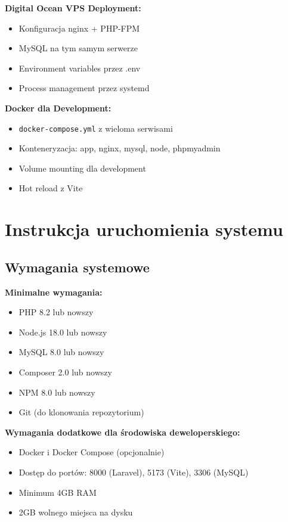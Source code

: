\documentclass[12pt,a4paper]{article}
\begin{document}
    \textbf{Digital Ocean VPS Deployment:}
    \begin{itemize}
        \item Konfiguracja nginx + PHP-FPM
        \item MySQL na tym samym serwerze
        \item Environment variables przez .env
        \item Process management przez systemd
    \end{itemize}

    \textbf{Docker dla Development:}
    \begin{itemize}
        \item \texttt{docker-compose.yml} z wieloma serwisami
        \item Konteneryzacja: app, nginx, mysql, node, phpmyadmin
        \item Volume mounting dla development
        \item Hot reload z Vite
    \end{itemize}

    \section{Instrukcja uruchomienia systemu}

    \subsection{Wymagania systemowe}

    \textbf{Minimalne wymagania:}
    \begin{itemize}
        \item PHP 8.2 lub nowszy
        \item Node.js 18.0 lub nowszy
        \item MySQL 8.0 lub nowszy
        \item Composer 2.0 lub nowszy
        \item NPM 8.0 lub nowszy
        \item Git (do klonowania repozytorium)
    \end{itemize}

    \textbf{Wymagania dodatkowe dla środowiska deweloperskiego:}
    \begin{itemize}
        \item Docker i Docker Compose (opcjonalnie)
        \item Dostęp do portów: 8000 (Laravel), 5173 (Vite), 3306 (MySQL)
        \item Minimum 4GB RAM
        \item 2GB wolnego miejsca na dysku
    \end{itemize}
\end{document}

